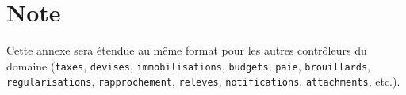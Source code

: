 \section{Note}
Cette annexe sera étendue au même format pour les autres contrôleurs du domaine (\texttt{taxes}, \texttt{devises}, \texttt{immobilisations}, \texttt{budgets}, \texttt{paie}, \texttt{brouillards}, \texttt{regularisations}, \texttt{rapprochement}, \texttt{releves}, \texttt{notifications}, \texttt{attachments}, etc.).

